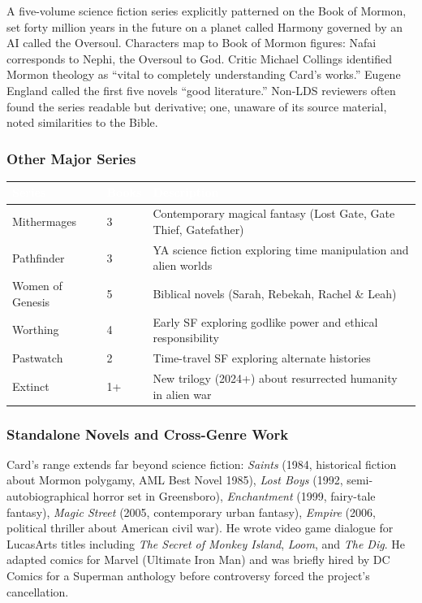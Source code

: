 \documentclass[11pt,letterpaper]{article}
\newcommand{\tableheader}[1]{\textbf{\sffamily\textcolor{white}{#1}}}
\begin{document}
A five-volume science fiction series explicitly patterned on the Book of Mormon, set forty million years in the future on a planet called Harmony governed by an AI called the Oversoul. Characters map to Book of Mormon figures: Nafai corresponds to Nephi, the Oversoul to God. Critic Michael Collings identified Mormon theology as ``vital to completely understanding Card's works.'' Eugene England called the first five novels ``good literature.'' Non-LDS reviewers often found the series readable but derivative; one, unaware of its source material, noted similarities to the Bible.

\subsubsection{Other Major Series}

\begin{center}
\begin{tabularx}{\textwidth}{L{3.5cm}C{1.5cm}X}
\toprule
{}
\tableheader{Series} & \tableheader{Books} & \tableheader{Description} \\
\midrule
Mithermages & 3 & Contemporary magical fantasy (Lost Gate, Gate Thief, Gatefather) \\
Pathfinder & 3 & YA science fiction exploring time manipulation and alien worlds \\
Women of Genesis & 5 & Biblical novels (Sarah, Rebekah, Rachel \& Leah) \\
Worthing & 4 & Early SF exploring godlike power and ethical responsibility \\
Pastwatch & 2 & Time-travel SF exploring alternate histories \\
Extinct & 1+ & New trilogy (2024+) about resurrected humanity in alien war \\
\bottomrule
\end{tabularx}
\end{center}

\subsubsection{Standalone Novels and Cross-Genre Work}

Card's range extends far beyond science fiction: \textit{Saints} (1984, historical fiction about Mormon polygamy, AML Best Novel 1985), \textit{Lost Boys} (1992, semi-autobiographical horror set in Greensboro), \textit{Enchantment} (1999, fairy-tale fantasy), \textit{Magic Street} (2005, contemporary urban fantasy), \textit{Empire} (2006, political thriller about American civil war). He wrote video game dialogue for LucasArts titles including \textit{The Secret of Monkey Island}, \textit{Loom}, and \textit{The Dig}. He adapted comics for Marvel (Ultimate Iron Man) and was briefly hired by DC Comics for a Superman anthology before controversy forced the project's cancellation.
\end{document}
